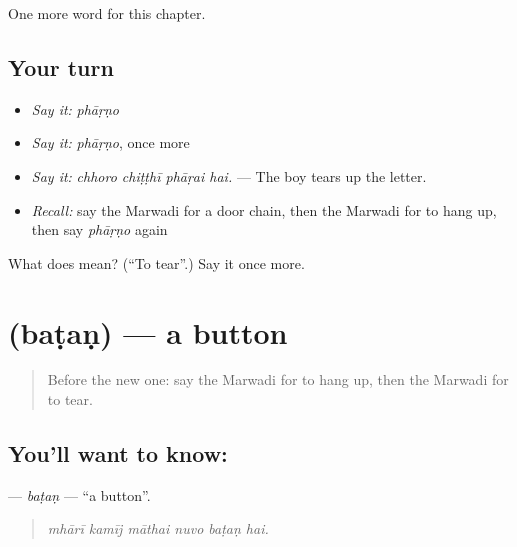 \begin{grammarlens}[title={What you've built}]
One more word for this chapter.
\end{grammarlens}

\subsection*{Your turn}
\begin{itemize}
\raggedright
  \item \emph{Say it:} \emph{phāṛṇo}
  \item \emph{Say it:} \emph{phāṛṇo}, once more
  \item \emph{Say it:} \emph{chhoro chiṭṭhī phāṛai hai.} — The boy tears up the letter.
  \item \emph{Recall:} say the Marwadi for a door chain, then the Marwadi for to hang up, then say \emph{phāṛṇo} again
\end{itemize}

\begin{tcolorbox}[breakable,colback=teal!4,colframe=teal!35!black,title={Before you move on}]
What does  mean? (\textquotedblleft{}To tear\textquotedblright{}.) Say it once more.
\end{tcolorbox}
\section[\texorpdfstring{\mw{बटण} (baṭaṇ)}{बटण (baṭaṇ)}]{ (baṭaṇ) — a button}

\label{lesson:MW-C177-batan}



\begin{quote}
Before the new one: say the Marwadi for to hang up, then the Marwadi for to tear.
\end{quote}

\subsection*{You'll want to know: }
\textbf{} — \emph{baṭaṇ} — \textquotedblleft{}a button\textquotedblright{}.

\begin{quote}
     
\end{quote}

\begin{quote}
\emph{mhārī kamīj māthai nuvo baṭaṇ hai.}
\end{quote}

